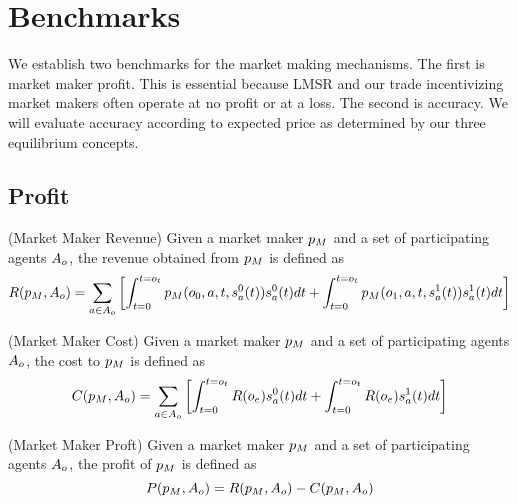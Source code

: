 \section{Benchmarks}
We establish two benchmarks for the market making mechanisms. The first is market maker profit. This is essential because LMSR and our trade incentivizing market makers often operate at no profit or at a loss. The second is accuracy. We will evaluate accuracy according to expected price as determined by our three equilibrium concepts.

\subsection{Profit}
  \begin{definition} (Market Maker Revenue)
  \label{def:mmr}
   Given a market maker $p_M$ and a set of participating agents
   $A_o$, the revenue obtained from $p_M$ is defined as
     $$R(p_M, A_o) = 
      \sum_{a\in A_o} \left[
	\int_{t = 0}^{t = o_t} 
	  p_M(o_0,a,t, s^{0}_{a}(t))s^{0}_{a}(t)dt
	  + \int_{t = 0}^{t = o_t} 
	  p_M(o_1,a,t, s^{1}_{a}(t))s^{1}_{a}(t)dt\right]$$
  \end{definition}
  
    \begin{definition} (Market Maker Cost)
  \label{def:mmc}
   Given a market maker $p_M$ and a set of participating agents
   $A_o$, the cost to $p_M$ is defined as
     $$ C(p_M, A_o) =
     \sum_{a\in A_o} \left[
	\int_{t = 0}^{t = o_t} 
	R(o_e)s^{0}_{a}(t)dt
	+\int_{t = 0}^{t = o_t} 
	R(o_e)s^{1}_{a}(t)dt
	\right]$$
  \end{definition}

      \begin{definition} (Market Maker Proft)
  \label{def:mmf}
   Given a market maker $p_M$ and a set of participating agents
   $A_o$, the profit of $p_M$ is defined as
     $$ P(p_M, A_o) = R(p_M, A_o) 
     - C(p_M, A_o)$$
  \end{definition}
  
